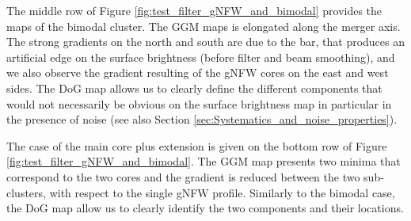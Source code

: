 \documentclass[twocolumn,traditabstract]{aa}
\begin{document}
The middle row of Figure \ref{fig:test_filter_gNFW_and_bimodal} provides the maps of the bimodal cluster. The GGM maps is elongated along the merger axis. The strong gradients on the north and south are due to the bar, that produces an artificial edge on the surface brightness (before filter and beam smoothing), and we also observe the gradient resulting of the gNFW cores on the east and west sides. The DoG map allows us to clearly define the different components that would not necessarily be obvious on the surface brightness map in particular in the presence of noise (see also Section \ref{sec:Systematics_and_noise_properties}).

The case of the main core plus extension is given on the bottom row of Figure \ref{fig:test_filter_gNFW_and_bimodal}. The GGM map presents two minima that correspond to the two cores and the gradient is reduced between the two sub-clusters, with respect to the single gNFW profile. Similarly to the bimodal case, the DoG map allow us to clearly identify the two components and their locations.
\end{document}
